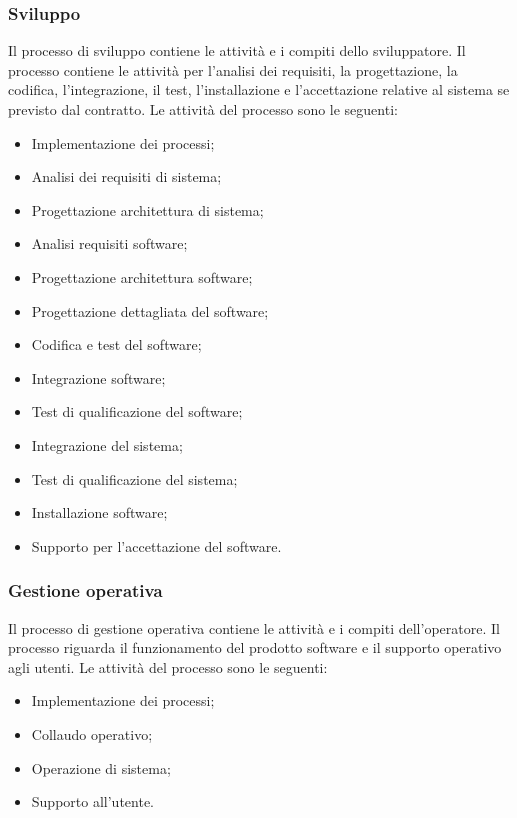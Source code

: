 \subsubsection{Sviluppo}
Il processo di sviluppo contiene le attività e i compiti dello sviluppatore.
Il processo contiene le attività per l'analisi dei requisiti, la progettazione, la codifica, l'integrazione, il test, l'installazione e l'accettazione relative al sistema se previsto dal contratto.
Le attività del processo sono le seguenti:
\begin{itemize}
\item Implementazione dei processi;
\item Analisi dei requisiti di sistema;
\item Progettazione architettura di sistema;
\item Analisi requisiti software;
\item Progettazione architettura software;
\item Progettazione dettagliata del software;
\item Codifica e test del software;
\item Integrazione software;
\item Test di qualificazione del software;
\item Integrazione del sistema;
\item Test di qualificazione del sistema; 
\item Installazione software;
\item Supporto per l'accettazione del software.
\end{itemize}

\subsubsection{Gestione operativa}
Il processo di gestione operativa contiene le attività e i compiti dell'operatore. Il processo riguarda il funzionamento del prodotto software e il supporto operativo agli utenti. 
Le attività del processo sono le seguenti:
\begin{itemize}
\item Implementazione dei processi;
\item Collaudo operativo;
\item Operazione di sistema;
\item Supporto all'utente.
\end{itemize}


